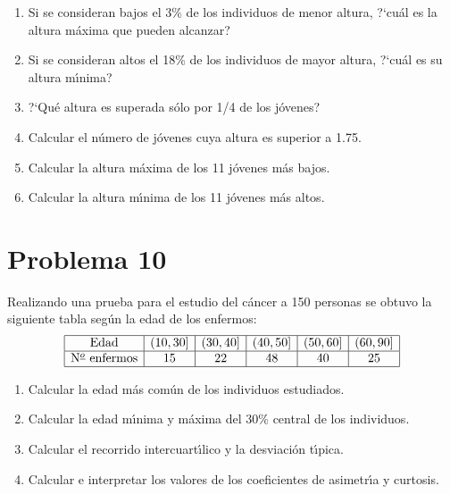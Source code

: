 \documentclass{article}
\begin{document}
	\begin{enumerate}
		\item Si se consideran bajos el 3\% de los individuos de menor  altura,
		?`cu{\'a}l es la altura m{\'a}xima que pueden alcanzar?
		\item Si se consideran altos el 18\% de los individuos de mayor  altura,
		?`cu{\'a}l es su altura m{\'\i}nima?
		\item ?`Qu{\'e} altura es superada s{\'o}lo por 1/4 de los j{\'o}venes?
		\item Calcular el n{\'u}mero de j{\'o}venes cuya altura es superior a 1.75.
		\item Calcular la altura m{\'a}xima de los 11 j{\'o}venes m{\'a}s bajos.
		\item Calcular la altura m{\'\i}nima de los 11 j{\'o}venes m{\'a}s altos. \\
	\end{enumerate}
	
	\color{black}
	
	
	
	
	\section{Problema 10}
	\color{blue}
	Realizando una prueba para el estudio del  c{\'a}ncer  a  150  personas  se
	obtuvo la siguiente tabla seg{\'u}n la edad de los enfermos:
	$$
	\begin{array}{|c|c|c|c|c|c|} \hline
	\mbox{Edad}        & (10,30] & (30,40] & (40,50] & (50,60] & (60,90] \\ \hline
	\mbox{N${}^{\underline{o}}$ enfermos} &   15  &   22  &   48  &   40  &  25   \\ \hline
	\end{array}
	$$
	\begin{enumerate}
		\item Calcular la edad m{\'a}s com{\'u}n de los individuos estudiados.
		\item Calcular la edad m{\'\i}nima y m{\'a}xima del 30\% central de los individuos.
		\item Calcular el recorrido intercuart{\'\i}lico y la desviaci{\'o}n t{\'\i}pica.
		\item Calcular e interpretar los valores de los coeficientes de asimetr{\'\i}a y curtosis. \\
	\end{enumerate}
	
	\color{black}
	
	
\end{document}
